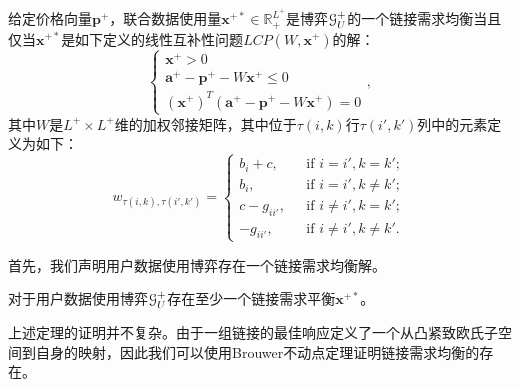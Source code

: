 \begin{lm}\label{lm:LCP}

给定价格向量$\mathbf{p}^{+}$，联合数据使用量$\mathbf{x}^{+*}\in\mathbb{R}^{L^+}_+$是博弈$\mathcal{G}_U^{+}$的一个链接需求均衡当且仅当$\mathbf{x}^{+*}$是如下定义的线性互补性问题$LCP(W,\mathbf{x}^{+})$的解：
\begin{equation}\label{eq:LCP}
\begin{cases}
    \mathbf{x}^{+}>0\\
    \mathbf{a}^{+}-\mathbf{p}^{+}-W\mathbf{x}^{+}\leq 0\\
    (\mathbf{x}^{+})^T(\mathbf{a}^{+}-\mathbf{p}^{+}-W\mathbf{x^{+}})=0
\end{cases},
\end{equation}
\noindent 其中$W$是$L^+\times L^+$维的加权邻接矩阵，其中位于$\tau(i,k)$行$\tau(i',k')$列中的元素定义为如下：
\begin{equation}
w_{\tau(i,k),\tau(i',k')}=
\begin{cases}
  b_i+c,~~~&\mbox{if $i=i', k=k'$};\\
  b_i,~~~&\mbox{if $i=i', k\neq k'$};\\
  c-g_{ii'},~~~&\mbox{if $i\neq i', k=k'$};\\
  -g_{ii'},~~~&\mbox{if $i\neq i', k\neq k'$}.
\end{cases}
\end{equation}
\end{lm}

首先，我们声明用户数据使用博弈存在一个链接需求均衡解。

\begin{thm}
对于用户数据使用博弈$\mathcal{G}_U^+$存在至少一个链接需求平衡$\mathbf{x}^{+*}$。
\end{thm}
上述定理的证明并不复杂。由于一组链接的最佳响应定义了一个从凸紧致欧氏子空间到自身的映射，因此我们可以使用Brouwer不动点定理证明链接需求均衡的存在。 


